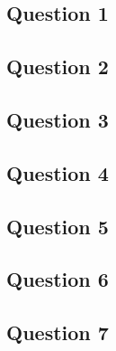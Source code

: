 \documentclass[12pt,a4paper]{article}
\begin{document}
\subsection*{Question 1}

\newpage
\subsection*{Question 2}

\newpage
\subsection*{Question 3}

\newpage
\subsection*{Question 4}

\newpage
\subsection*{Question 5}

\newpage
\subsection*{Question 6}

\newpage
\subsection*{Question 7}

\newpage
\thispagestyle{empty}
\end{document}
